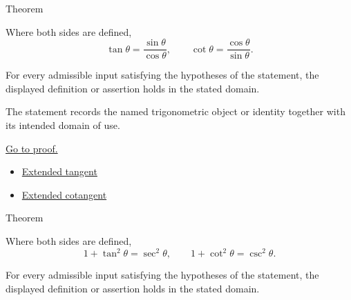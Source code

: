 

\begin{theorembox}{Theorem}
\begin{theorem}
\label{thm:trig-quotient-identities}
Where both sides are defined,
\[
  \tan\theta=\frac{\sin\theta}{\cos\theta},\qquad
  \cot\theta=\frac{\cos\theta}{\sin\theta}.
\]
\end{theorem}
\end{theorembox}
\begin{remark*}
For every admissible input satisfying the hypotheses of the statement, the
displayed definition or assertion holds in the stated domain.
\end{remark*}

\begin{remark*}[Interpretation]
The statement records the named trigonometric object or identity together with
its intended domain of use.
\end{remark*}

\begin{remark*}[Proof]
\hyperref[prf:trig-quotient-identities]{Go to proof.}
\end{remark*}
\begin{dependencies}
\begin{itemize}
  \item \hyperref[def:extended-tangent]{Extended tangent}
  \item \hyperref[def:extended-cotangent]{Extended cotangent}
\end{itemize}
\end{dependencies}



\begin{theorembox}{Theorem}
\begin{theorem}
\label{thm:trig-tangent-pythagorean-identities}
Where both sides are defined,
\[
  1+\tan^2\theta=\sec^2\theta,
  \qquad
  1+\cot^2\theta=\csc^2\theta.
\]
\end{theorem}
\end{theorembox}
\begin{remark*}
For every admissible input satisfying the hypotheses of the statement, the
displayed definition or assertion holds in the stated domain.
\end{remark*}

